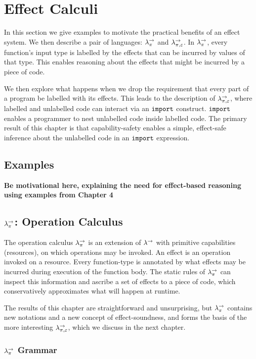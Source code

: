 \chapter{Effect Calculi}

In this section we give examples to motivate the practical benefits of an effect system. We then describe a pair of languages: $\lambda^{\rightarrow}_{\pi}$ and $\lambda^{\rightarrow}_{\pi, \varepsilon}$. In $\lambda^{\rightarrow}_{\pi}$, every function's input type is labelled by the effects that can be incurred by values of that type. This enables reasoning about the effects that might be incurred by a piece of code.

We then explore what happens when we drop the requirement that every part of a program be labelled with its effects. This leads to the description of $\lambda^{\rightarrow}_{\pi, \varepsilon}$, where labelled and unlabelled code can interact via an $\mathtt{import}$ construct. $\mathtt{import}$ enables a programmer to nest unlabelled code inside labelled code. The primary result of this chapter is that capability-safety enables a simple, effect-safe inference about the unlabelled code in an $\mathtt{import}$ expression.

\section{Examples}

\textbf{Be motivational here, explaining the need for effect-based reasoning using examples from Chapter 4}

\section{$\lambda^{\rightarrow}_{\pi}$: Operation Calculus}

The operation calculus $\lambda^{\rightarrow}_{\pi}$ is an extension of $\lambda^{\rightarrow}$ with primitive capabilities (resources), on which operations may be invoked. An effect is an operation invoked on a resource. Every function-type is annotated by what effects may be incurred during execution of the function body. The static rules of $\lambda^{\rightarrow}_{\pi}$ can inspect this information and ascribe a set of effects to a piece of code, which conservatively approximates what will happen at runtime.

The results of this chapter are straightforward and unsurprising, but $\lambda^{\rightarrow}_{\pi}$ contains new notations and a new concept of effect-soundness, and forms the basis of the more interesting $\lambda^{\rightarrow}_{\pi, \varepsilon}$, which we discuss in the next chapter.

\subsection{$\lambda^{\rightarrow}_{\pi}$ Grammar}

